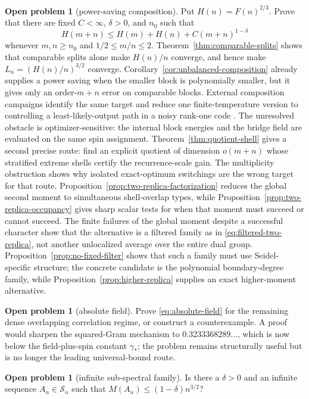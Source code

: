 \documentclass[11pt]{article}
\theoremstyle{definition}
\newtheorem{problem}[theorem]{Open problem}
\theoremstyle{remark}
\newcommand{\Sn}{\mathcal S_n}
\begin{document}
\begin{problem}[power-saving composition]\label{prob:composition}
Put $H(n)=F(n)^{2/3}$.  Prove that there are fixed
$C<\infty$, $\delta>0$, and $n_0$ such that
\[
 H(m+n)\le H(m)+H(n)+C(m+n)^{1-\delta}
\]
whenever $m,n\ge n_0$ and $1/2\le m/n\le2$.  Theorem~\ref{thm:comparable-splits}
shows that comparable splits alone make $H(n)/n$ converge, and hence make
$L_n=(H(n)/n)^{3/2}$ converge.  Corollary~\ref{cor:unbalanced-composition}
already supplies a power saving when the smaller block is polynomially
smaller, but it gives only an order-$m+n$ error on comparable blocks.  External
composition campaigns identify the same target and reduce one
finite-temperature version to controlling a least-likely-output path in a
noisy rank-one code \cite{beaumont-ledger}.  The unresolved obstacle is
optimizer-sensitive: the internal block energies and the bridge field are
evaluated on the same spin assignment.  Theorem~\ref{thm:quotient-shell}
gives a second precise route: find an explicit quotient of dimension
$o(m+n)$ whose stratified extreme shells certify the recurrence-scale gain.
The multiplicity obstruction shows why isolated exact-optimum switchings are
the wrong target for that route.  Proposition~\ref{prop:two-replica-factorization}
reduces the global second moment to simultaneous shell-overlap types, while
Proposition~\ref{prop:two-replica-occupancy} gives sharp scalar tests for when
that moment must succeed or cannot succeed.  The finite failures of the
global moment despite a successful character show that the alternative is a
filtered family as in \eqref{eq:filtered-two-replica}, not another unlocalized
average over the entire dual group.  Proposition~\ref{prop:no-fixed-filter}
shows that such a family must use Seidel-specific structure; the concrete
candidate is the polynomial boundary-degree family, while
Proposition~\ref{prop:higher-replica} supplies an exact higher-moment
alternative.
\end{problem}

\begin{problem}[absolute field]
Prove \eqref{eq:absolute-field} for the remaining dense overlapping
correlation regime, or construct a counterexample.  A proof would sharpen the
squared-Gram mechanism to $0.3233368289\ldots$, which is now below the
field-plus-spin constant $\gamma_*$; the problem remains structurally useful
but is no longer the leading universal-bound route.
\end{problem}

\begin{problem}[infinite sub-spectral family]
Is there a $\delta>0$ and an infinite sequence $A_n\in\Sn$ such that
$M(A_n)\le(1-\delta)n^{3/2}$?
\end{problem}
\end{document}
